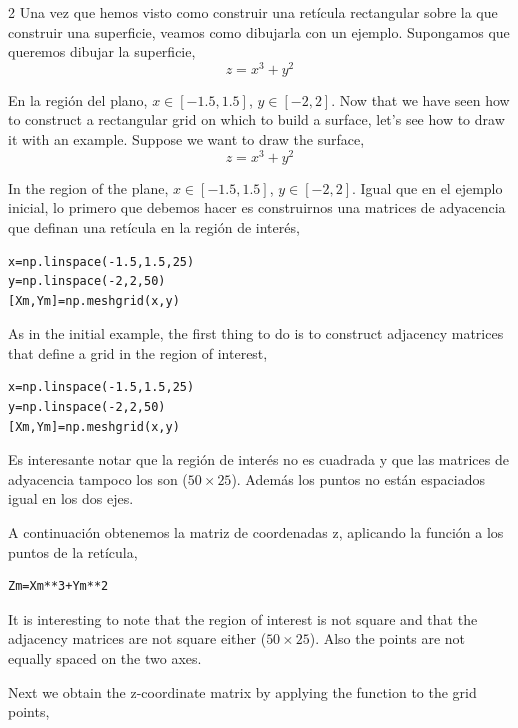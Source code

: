 \begin{paracol} {2}
Una vez que hemos visto como construir una retícula rectangular sobre la que construir una superficie, veamos como dibujarla con un ejemplo. Supongamos que queremos dibujar la superficie,
\begin{equation*}
z=x^3+y^2
\end{equation*}

En la región del plano, $x\in[-1.5,1.5]$, $y\in[-2,2]$. 
\switchcolumn
Now that we have seen how to construct a rectangular grid on which to build a surface, let's see how to draw it with an example. Suppose we want to draw the surface,
\begin{equation*}
z=x^3+y^2
\end{equation*}

In the region of the plane, $x\in[-1.5,1.5]$, $y\in[-2,2]$. 
\switchcolumn
Igual que en el ejemplo inicial, lo primero que debemos hacer es construirnos una matrices de adyacencia que definan una retícula en la región de interés,

\begin{verbatim}
x=np.linspace(-1.5,1.5,25)
y=np.linspace(-2,2,50)
[Xm,Ym]=np.meshgrid(x,y)
\end{verbatim}

\switchcolumn
As in the initial example, the first thing to do is to construct adjacency matrices that define a grid in the region of interest,

\begin{verbatim}
x=np.linspace(-1.5,1.5,25)
y=np.linspace(-2,2,50)
[Xm,Ym]=np.meshgrid(x,y)
\end{verbatim}

\switchcolumn

Es interesante notar que la región de interés no es cuadrada y que las matrices de adyacencia tampoco los son ($50\times 25$). Además los puntos no están espaciados igual en los dos ejes.

A continuación obtenemos la matriz de coordenadas z, aplicando la función a los puntos de la retícula,

\begin{verbatim}
Zm=Xm**3+Ym**2
\end{verbatim}

\switchcolumn
It is interesting to note that the region of interest is not square and that the adjacency matrices are not square either ($50\times 25$). Also the points are not equally spaced on the two axes.

Next we obtain the z-coordinate matrix by applying the function to the grid points,


\end{paracol}
